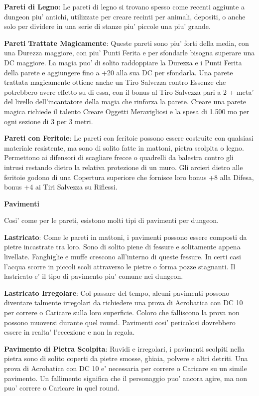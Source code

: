 \documentclass[a4paper,11pt,twoside,openany]{dndbook}
\begin{document}
\textbf{Pareti di Legno}: Le pareti di legno si trovano spesso come recenti aggiunte a dungeon piu' antichi, utilizzate per creare recinti per animali, depositi, o anche solo per dividere in una serie di stanze piu' piccole una piu' grande.

\textbf{Pareti Trattate Magicamente}: Queste pareti sono piu' forti della media, con una Durezza maggiore, con piu' Punti Ferita e per sfondarle bisogna superare una DC maggiore. La magia puo' di solito raddoppiare la Durezza e i Punti Ferita della parete e aggiungere fino a +20 alla sua DC per sfondarla. Una parete trattata magicamente ottiene anche un Tiro Salvezza contro Essenze che potrebbero avere effetto su di essa, con il bonus al Tiro Salvezza pari a 2 + meta' del livello dell'incantatore della magia che rinforza la parete. Creare una parete magica richiede il talento Creare Oggetti Meravigliosi e la spesa di 1.500 mo per ogni sezione di 3 per 3 metri.

\textbf{Pareti con Feritoie}: Le pareti con feritoie possono essere costruite con qualsiasi materiale resistente, ma sono di solito fatte in mattoni, pietra scolpita o legno. Permettono ai difensori di scagliare frecce o quadrelli da balestra contro gli intrusi restando dietro la relativa protezione di un muro. Gli arcieri dietro alle feritoie godono di una Copertura superiore che fornisce loro bonus +8 alla Difesa, bonus +4 ai Tiri Salvezza su Riflessi.

\textbf{Pavimenti}

Cosi' come per le pareti, esistono molti tipi di pavimenti per dungeon.

\textbf{Lastricato}: Come le pareti in mattoni, i pavimenti possono essere composti da pietre incastrate tra loro. Sono di solito piene di fessure e solitamente appena livellate. Fanghiglie e muffe crescono all'interno di queste fessure. In certi casi l'acqua scorre in piccoli scoli attraverso le pietre o forma pozze stagnanti. Il lastricato e' il tipo di pavimento piu' comune nei dungeon.

\textbf{Lastricato Irregolare}: Col passare del tempo, alcuni pavimenti possono diventare talmente irregolari da richiedere una prova di Acrobatica con DC 10 per correre o Caricare sulla loro superficie. Coloro che falliscono la prova non possono muoversi durante quel round. Pavimenti cosi' pericolosi dovrebbero essere in realta' l'eccezione e non la regola.

\textbf{Pavimento di Pietra Scolpita}: Ruvidi e irregolari, i pavimenti scolpiti nella pietra sono di solito coperti da pietre smosse, ghiaia, polvere e altri detriti. Una prova di Acrobatica con DC 10 e' necessaria per correre o Caricare su un simile pavimento. Un fallimento significa che il personaggio puo' ancora agire, ma non puo' correre o Caricare in quel round.
\end{document}

